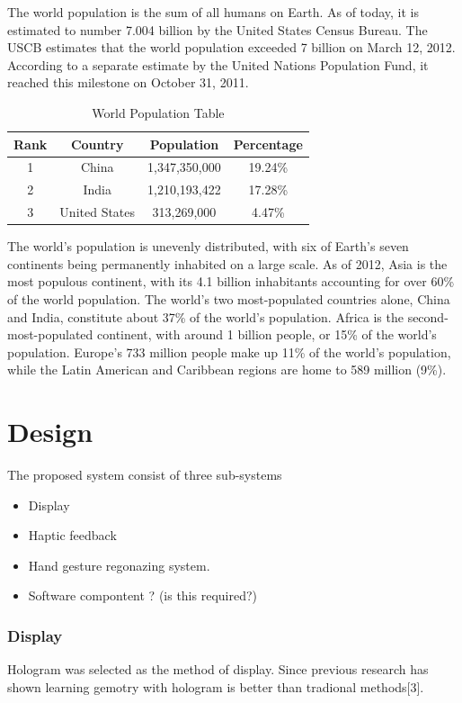 \documentclass{fisatproject}
\begin{document}
The world population is the sum of all humans on Earth. As of today, it is estimated to number 7.004 billion by the United States Census Bureau. The USCB estimates that the world population exceeded 7 billion on March 12, 2012. According to a separate estimate by the United Nations Population Fund, it reached this milestone on October 31, 2011.
\begin{table}[h!]
\begin{center}
\begin{tabular}{|c|c|c|c|}
\hline Rank & Country & Population  & Percentage  \\ 
\hline 1 & China & 1,347,350,000 & 19.24\% \\ 
\hline 2 & India & 1,210,193,422  & 17.28\% \\ 
\hline 3 & United States & 313,269,000 & 4.47\% \\ 
\hline 
\end{tabular}
\caption{World Population Table} 
\end{center}
\end{table}
The world's population is unevenly distributed, with six of Earth's seven continents being permanently inhabited on a large scale. As of 2012, Asia is the most populous continent, with its 4.1 billion inhabitants accounting for over 60\% of the world population. The world's two most-populated countries alone, China and India, constitute about 37\% of the world's population. Africa is the second-most-populated continent, with around 1 billion people, or 15\% of the world's population. Europe's 733 million people make up 11\% of the world's population, while the Latin American and Caribbean regions are home to 589 million (9\%).


\chapter{Design}

The proposed system consist of three sub-systems
\begin{itemize}
    \item  Display
    \item Haptic feedback
    \item Hand gesture regonazing system.
    \item Software compontent ? (is this required?)
\end{itemize}
\subsection{Display}
Hologram was selected as the method of display. Since previous  research has shown learning gemotry with hologram is better than tradional methods[3].
\end{document}
